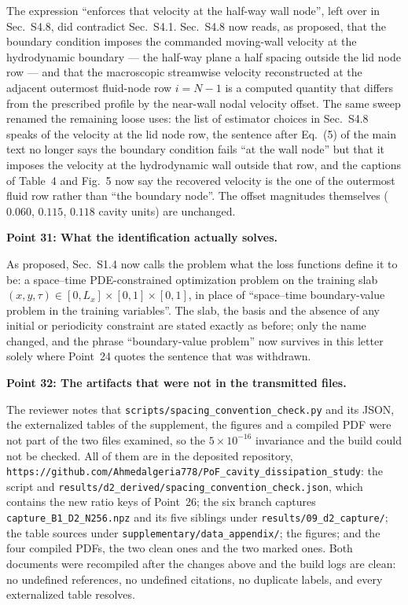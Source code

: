 \documentclass[11pt,a4paper]{article}
\begin{document}
The expression ``enforces that velocity at the half-way wall node'', left over in
Sec.~S4.8, did contradict Sec.~S4.1. Sec.~S4.8 now reads, as proposed, that the
boundary condition imposes the commanded moving-wall velocity at the hydrodynamic
boundary --- the half-way plane a half spacing outside the lid node row --- and that
the macroscopic streamwise velocity reconstructed at the adjacent outermost fluid-node
row $i=N-1$ is a computed quantity that differs from the prescribed profile by the
near-wall nodal velocity offset. The same sweep renamed the remaining loose uses: the list
of estimator choices in Sec.~S4.8 speaks of the velocity at the lid node row, the
sentence after Eq.~(5) of the main text no longer says the boundary condition fails
``at the wall node'' but that it imposes the velocity at the hydrodynamic wall outside
that row, and the captions of Table~4 and Fig.~5 now say the recovered velocity is the
one of the outermost fluid row rather than ``the boundary node''. The offset magnitudes
themselves ($0.060$, $0.115$, $0.118$ cavity units) are unchanged.

\vspace{1em}

\noindent\textbf{Point 31: What the identification actually solves.}

As proposed, Sec.~S1.4 now calls the problem what the loss functions define it to be:
a space--time PDE-constrained optimization problem on the training slab
$(x,y,\tau)\in[0,L_x]\times[0,1]\times[0,1]$, in place of ``space--time boundary-value
problem in the training variables''. The slab, the basis and the absence of any
initial or periodicity constraint are stated exactly as before; only the name changed,
and the phrase ``boundary-value problem'' now survives in this letter solely where
Point~24 quotes the sentence that was withdrawn.

\vspace{1em}

\noindent\textbf{Point 32: The artifacts that were not in the transmitted files.}

The reviewer notes that \texttt{scripts/spacing\_convention\_check.py} and its JSON,
the externalized tables of the supplement, the figures and a compiled PDF were
not part of the two files examined, so the $5\times10^{-16}$ invariance and the build
could not be checked. All of them are in the deposited repository,
\texttt{https://github.com/Ahmedalgeria778/PoF\_cavity\_dissipation\_study}: the script
and \texttt{results/d2\_derived/}\hspace{0pt}\texttt{spacing\_convention\_check.json},
which contains the new ratio keys of Point~26; the six branch captures
\texttt{capture\_B1\_D2\_N256.npz} and its five siblings under
\texttt{results/09\_d2\_capture/}; the table sources under
\texttt{supplementary/data\_appendix/}; the figures; and the four compiled PDFs,
the two clean ones and the two marked ones. Both documents were recompiled after the
changes above and the build logs are clean: no undefined references, no undefined
citations, no
duplicate labels, and every externalized table resolves.
\end{document}
